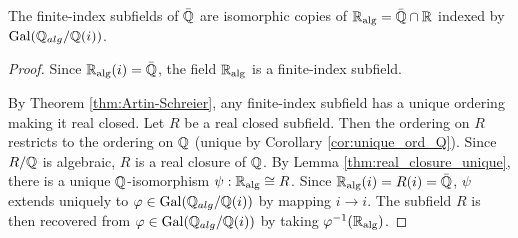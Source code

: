 \begin{theorem}
  \label{thm:Q_alg_unique_fin_ind}
  The finite-index subfields of $\bar{\mathbb{Q}}$ are isomorphic copies of $\mathbb{R}_{\text{alg}}=\bar{\mathbb{Q}}\cap\mathbb{R}$ indexed by $\operatorname{Gal}(\mathbb{Q}_{alg}/\mathbb{Q}(i))$.
\end{theorem}
\begin{proof}
  Since $\mathbb{R}_{\text{alg}}(i)=\bar{\mathbb{Q}}$, the field $\mathbb{R}_{\text{alg}}$ is a finite-index subfield.

  By Theorem \ref{thm:Artin-Schreier}, any finite-index subfield has a unique ordering making it real closed. Let $R$ be a real closed subfield. Then the ordering on $R$ restricts to the ordering on $\mathbb{Q}$ (unique by Corollary \ref{cor:unique_ord_Q}). Since $R/\mathbb{Q}$ is algebraic, $R$ is a real closure of $\mathbb{Q}$. By Lemma \ref{thm:real_closure_unique}, there is a unique $\mathbb{Q}$-isomorphism $\psi:\mathbb{R}_{\text{alg}}\cong R$. Since $\mathbb{R}_{\text{alg}}(i)=R(i)=\bar{\mathbb{Q}}$, $\psi$ extends uniquely to $\varphi\in\operatorname{Gal}(\mathbb{Q}_{alg}/\mathbb{Q}(i))$ by mapping $i\to i$. The subfield $R$ is then recovered from $\varphi\in\operatorname{Gal}(\mathbb{Q}_{alg}/\mathbb{Q}(i))$ by taking $\varphi^{-1}(\mathbb{R}_{\text{alg}})$.
\end{proof}


